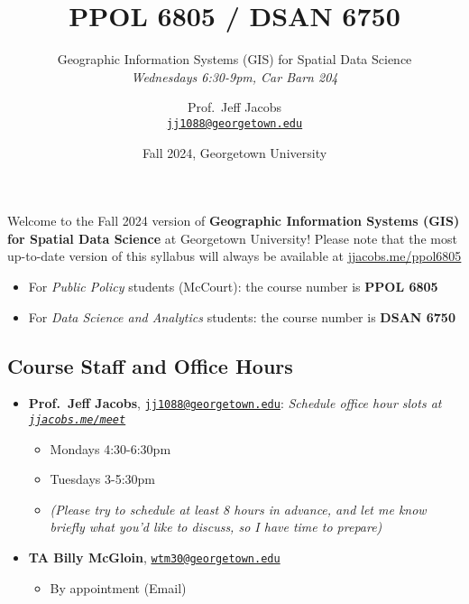 \documentclass[
]{scrartcl}
\title{PPOL 6805 / DSAN 6750}
\subtitle{Geographic Information Systems (GIS) for Spatial Data
Science \\ \textit{Wednesdays 6:30-9pm, Car Barn 204}}
\author{Prof.~Jeff
Jacobs \\[-0.2em] \normalsize{\href{mailto:jj1088@georgetown.edu}{\texttt{jj1088@georgetown.edu}}}}
\date{\normalsize{Fall 2024, Georgetown University}}
\providecommand{\tightlist}{%
  \setlength{\itemsep}{0pt}\setlength{\parskip}{0pt}}\usepackage{longtable,booktabs,array}
\begin{document}
\maketitle


Welcome to the Fall 2024 version of \textbf{Geographic Information
Systems (GIS) for Spatial Data Science} at Georgetown University! Please
note that the most up-to-date version of this syllabus will always be
available at \href{https://jjacobs.me/ppol6805}{jjacobs.me/ppol6805}

\begin{tcolorbox}[enhanced jigsaw, left=2mm, colbacktitle=quarto-callout-note-color!10!white, opacitybacktitle=0.6, title=\textcolor{quarto-callout-note-color}{\faInfo}\hspace{0.5em}{Course Numbering}, toprule=.15mm, breakable, opacityback=0, colback=white, colframe=quarto-callout-note-color-frame, arc=.35mm, leftrule=.75mm, bottomtitle=1mm, toptitle=1mm, rightrule=.15mm, bottomrule=.15mm, coltitle=black, titlerule=0mm]

\begin{itemize}
\tightlist
\item
  For \emph{Public Policy} students (McCourt): the course number is
  \textbf{PPOL 6805}
\item
  For \emph{Data Science and Analytics} students: the course number is
  \textbf{DSAN 6750}
\end{itemize}

\end{tcolorbox}

\subsection{Course Staff and Office
Hours}\label{course-staff-and-office-hours}

\begin{itemize}
\tightlist
\item
  \textbf{Prof.~Jeff Jacobs},
  \href{mailto:jj1088@georgetown.edu}{\texttt{jj1088@georgetown.edu}}:
  \emph{Schedule office hour slots at
  \href{https://jjacobs.me/meet}{\texttt{jjacobs.me/meet}}}

  \begin{itemize}
  \tightlist
  \item
    Mondays 4:30-6:30pm
  \item
    Tuesdays 3-5:30pm
  \item
    \emph{(Please try to schedule at least 8 hours in advance, and let
    me know briefly what you'd like to discuss, so I have time to
    prepare)}
  \end{itemize}
\item
  \textbf{TA Billy McGloin},
  \href{mailto:wtm30@georgetown.edu}{\texttt{wtm30@georgetown.edu}}

  \begin{itemize}
  \tightlist
  \item
    By appointment (Email)
  \end{itemize}
\end{itemize}
\end{document}
